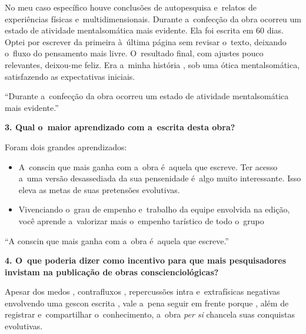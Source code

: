 \documentclass{gescons}
\begin{document}
\begin{multicols}{2}
No meu caso específico houve conclusões de autopesquisa e~relatos de experiências físicas e~multidimensionais. Durante a~confecção da obra ocorreu um estado de atividade mentalsomática mais evidente. Ela foi escrita em 60 dias. Optei por escrever da primeira à~última página sem  revisar o~texto, deixando o~fluxo do pensamento mais livre. O~resultado final, com ajustes pouco relevantes, deixou-me feliz. Era a~minha  história , sob uma ótica mentalsomática, satisfazendo as expectativas iniciais.

\begin{pullquote}
    ``Durante a~confecção da obra ocorreu um estado de atividade mentalsomática mais evidente.''
\end{pullquote}


\textbf{3.       Qual o~maior aprendizado com a~escrita desta obra?}

Foram dois grandes aprendizados:

\begin{itemize}
\item
  A~conscin que mais ganha com a~obra é~aquela que escreve. Ter acesso a~uma versão desassediada da sua pensenidade é~algo muito interessante. Isso eleva as metas de suas pretensões evolutivas.
\item
  Vivenciando o~grau de empenho e~trabalho da equipe envolvida na edição, você aprende a~valorizar mais o~empenho tarístico de todo o~grupo
\end{itemize}

\begin{pullquote}
    ``A conscin que mais ganha com a~obra é~aquela que escreve.''
\end{pullquote}


\textbf{4.       O~que poderia dizer como incentivo para que mais pesquisadores invistam na publicação de obras conscienciológicas?}

Apesar dos medos , contrafluxos , repercussões intra e~extrafísicas negativas envolvendo uma gescon escrita , vale a~pena seguir em frente porque , além de registrar e~compartilhar o~conhecimento, a~obra \emph{per si} chancela suas conquistas evolutivas. 



    


    \end{multicols}
\end{document}
